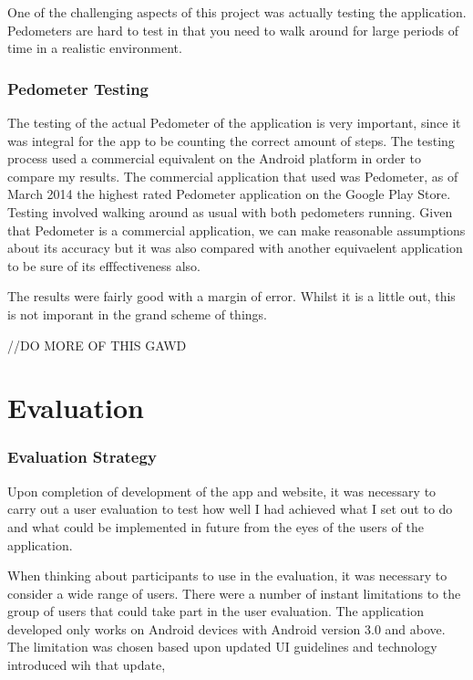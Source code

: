 \documentclass{l4proj}
\begin{document}
One of the challenging aspects of this project was actually testing the application. Pedometers are hard to test in that you need to walk around for large periods of time in a realistic environment.

\subsection{Pedometer Testing}

The testing of the actual Pedometer of the application is very important, since it was integral for the app to be counting the correct amount of steps. The testing process used a commercial equivalent on the Android platform in order to compare my results. The commercial application that used was Pedometer, as of March 2014 the highest rated Pedometer application on the Google Play Store. Testing involved walking around as usual with both pedometers running. Given that Pedometer is a commercial application, we can make reasonable assumptions about its accuracy but it was also compared with another equivaelent application to be sure of its efffectiveness also.

The results were fairly good with a margin of error. Whilst it is a little out, this is not imporant in the grand scheme of things.

//DO MORE OF THIS GAWD


\chapter{Evaluation}

\subsection{Evaluation Strategy}

Upon completion of development of the app and website, it was necessary to carry out a user evaluation to test how well I had achieved what I set out to do and what could be implemented in future from the eyes of the users of the application.

When thinking about participants to use in the evaluation, it was necessary to consider a wide range of users. There were a number of instant limitations to the group of users that could take part in the user evaluation. The application developed only works on Android devices with Android version 3.0 and above. The limitation was chosen based upon updated UI guidelines and technology introduced wih that update, 
\end{document}
